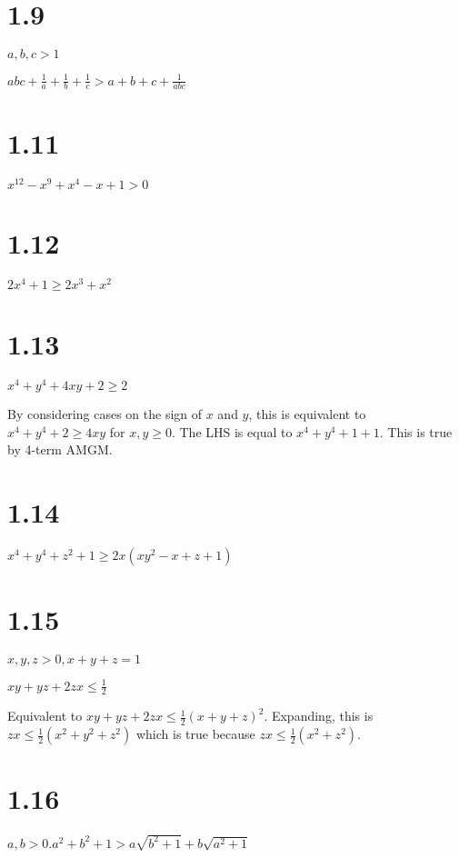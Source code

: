 \documentclass{article}
\def\f12{\frac{1}{2}}
\begin{document}
\section*{1.9}

$a, b, c > 1$

$abc + \frac{1}{a} + \frac{1}{b} + \frac{1}{c} > a + b + c + \frac{1}{abc}$

\section*{1.11}

$x^12 - x^9 + x^4 - x + 1 > 0$

\section*{1.12}

$2x^4 + 1 \ge 2x^3 + x^2$

\section*{1.13}

$x^4 + y^4 + 4xy + 2 \ge 2$

By considering cases on the sign of $x$ and $y$, this is equivalent to $x^4 + y^4 + 2 \ge 4xy$ for $x, y \ge 0$. The LHS is equal to $x^4 + y^4 + 1 + 1$. This is true by 4-term AMGM.

\section*{1.14}

$x^4 + y^4 + z^2 + 1 \ge 2x(xy^2 - x + z + 1)$

\section*{1.15}

$x, y, z > 0, x + y + z = 1$

$xy + yz + 2zx \le \frac{1}{2}$

Equivalent to $xy + yz + 2zx \le \f12 (x + y + z)^2$. Expanding, this is $zx \le \f12 (x^2 + y^2 + z^2)$ which is true because $zx \le \f12 (x^2 + z^2)$.

\section*{1.16}

$a, b > 0. a^2 + b^2 + 1 > a\sqrt{b^2 + 1} + b\sqrt{a^2 + 1}$
\end{document}
